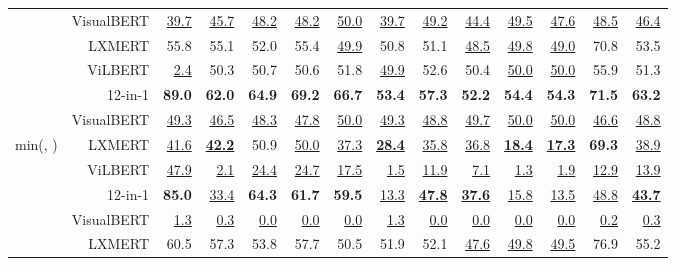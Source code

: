 \documentclass[11pt]{article}
\newcommand\redtable[1]{\underline{#1}}
\begin{document}
\begin{table*}[t!]
{\begin{tabular}{ l r r@{\hskip 0.2in}r@{\hskip 0.2in}rrr@{\hskip 0.2in}r@{\hskip 0.2in}rr@{\hskip 0.2in}rr@{\hskip 0.2in}r@{\hskip 0.2in}r }
        & \multirow{1}{*}{VisualBERT} & \redtable{39.7} & \redtable{45.7} & \redtable{48.2} & \redtable{48.2} & \redtable{50.0} & \redtable{39.7} & \redtable{49.2} & \redtable{44.4} & \redtable{49.5} & \redtable{47.6} & \redtable{48.5} & \redtable{46.4}\\
        \cmidrule{2-14}
        \multirow{4}{*}{}
        & \multirow{1}{*}{LXMERT} & 55.8 & 55.1 & 52.0 & 55.4 & \redtable{49.9} & 50.8 & 51.1 & \redtable{48.5} & \redtable{49.8} & \redtable{49.0} & 70.8 & 53.5 \\
        & \multirow{1}{*}{ViLBERT} & \redtable{2.4} & 50.3 & 50.7 & 50.6 & 51.8 & \redtable{49.9} & 52.6 & 50.4 & \redtable{50.0} & \redtable{50.0} & 55.9 & 51.3 \\
        & \multirow{1}{*}{12-in-1} & {\bf 89.0} & {\bf 62.0} & {\bf 64.9} & {\bf 69.2} & {\bf 66.7} & {\bf 53.4} & {\bf 57.3} & {\bf 52.2} & {\bf 54.4} & {\bf 54.3} & {\bf 71.5} & {\bf 63.2} \\
        & \multirow{1}{*}{VisualBERT} & \redtable{49.3} & \redtable{46.5} & \redtable{48.3} & \redtable{47.8} & \redtable{50.0} & \redtable{49.3} & \redtable{48.8} & \redtable{49.7} & \redtable{50.0} & \redtable{50.0} & \redtable{46.6} & \redtable{48.8} \\
        \cmidrule{2-14}
\cmidrule{2-14}
        \multirow{4}{*}{min(, )}
        & \multirow{1}{*}{LXMERT} & \redtable{41.6}  & \redtable{\bf 42.2} & 50.9 & \redtable{50.0} & \redtable{37.3} & \redtable{\bf 28.4} & \redtable{35.8} & \redtable{36.8} & \redtable{\bf 18.4} & \redtable{\bf 17.3} & {\bf 69.3} & \redtable{38.9} \\
        & \multirow{1}{*}{ViLBERT} & \redtable{47.9} & \redtable{2.1} & \redtable{24.4} & \redtable{24.7} & \redtable{17.5} & \redtable{1.5} & \redtable{11.9} & \redtable{7.1} & \redtable{1.3} & \redtable{1.9} & \redtable{12.9} & \redtable{13.9} \\
        & \multirow{1}{*}{12-in-1} & {\bf 85.0} & \redtable{33.4} & {\bf 64.3} & {\bf 61.7} & {\bf 59.5} & \redtable{13.3} & \redtable{\bf 47.8} & \redtable{\bf 37.6} & \redtable{15.8} & \redtable{13.5} & \redtable{48.8} & \redtable{\bf 43.7} \\
        & \multirow{1}{*}{VisualBERT} & \redtable{1.3}  & \redtable{0.3} & \redtable{0.0} & \redtable{0.0} & \redtable{0.0} & \redtable{1.3} & \redtable{0.0} & \redtable{0.0} & \redtable{0.0} & \redtable{0.0} & \redtable{0.2} & \redtable{0.3} \\
\cmidrule{2-14}
        \multirow{4}{1cm}{ }
        & \multirow{1}{*}{LXMERT} & 60.5 & 57.3 & 53.8 & 57.7 & 50.5 & 51.9 & 52.1 & \redtable{47.6} & \redtable{49.8} & \redtable{49.5} & 76.9 & 55.2 \\

\end{tabular}}
\end{table*}
\end{document}
